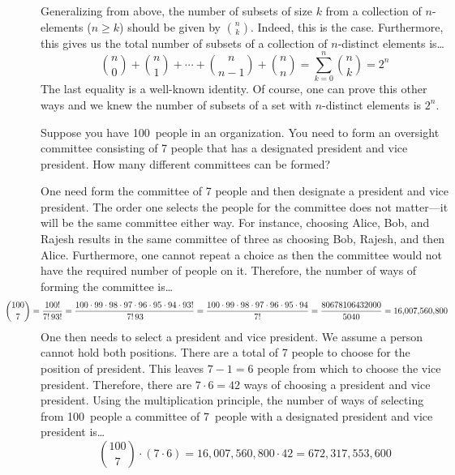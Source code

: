 \documentclass[11pt,letterpaper]{article}
\begin{document}
Generalizing from above, the number of subsets of size $k$ from a collection of $n$-elements ($n \geq k$) should be given by $\binom{n}{k}$. Indeed, this is the case. Furthermore, this gives us the total number of subsets of a collection of $n$-distinct elements is\dots
	\[
	\binom{n}{0} + \binom{n}{1} + \cdots + \binom{n}{n-1} + \binom{n}{n}= \sum_{k= 0}^n \binom{n}{k}= 2^n
	\]
The last equality is a well-known identity. Of course, one can prove this other ways and we knew the number of subsets of a set with $n$-distinct elements is $2^n$. 



\newpage



 Suppose you have 100~people in an organization. You need to form an oversight committee consisting of 7 people that has a designated president and vice president. How many different committees can be formed? \pspace 

\sol One need form the committee of 7 people and then designate a president and vice president. The order one selects the people for the committee does not matter---it will be the same committee either way. For instance, choosing Alice, Bob, and Rajesh results in the same committee of three as choosing Bob, Rajesh, and then Alice. Furthermore, one cannot repeat a choice as then the committee would not have the required number of people on it. Therefore, the number of ways of forming the committee is\dots
	\[
	\hspace{-1.5cm} \binom{100}{7}= \dfrac{100!}{7! \, 93!}= \dfrac{100 \cdot 99 \cdot 98 \cdot 97 \cdot 96 \cdot 95 \cdot 94 \cdot 93!}{7! \, 93\!}= \dfrac{100 \cdot 99 \cdot 98 \cdot 97 \cdot 96 \cdot 95 \cdot 94}{7!}= \dfrac{80678106432000}{5040}= 16,\!007,\!560,\!800
	\]
One then needs to select a president and vice president. We assume a person cannot hold both positions. There are a total of 7 people to choose for the position of president. This leaves $7 - 1= 6$ people from which to choose the vice president. Therefore, there are $7 \cdot 6= 42$ ways of choosing a president and vice president. Using the multiplication principle, the number of ways of selecting from 100~people a committee of 7~people with a designated president and vice president is\dots
	\[
	\binom{100}{7} \cdot (7 \cdot 6)= 16,\!007,\!560,\!800 \cdot 42= 672,\!317,\!553,\!600
	\] \pspace
\end{document}
